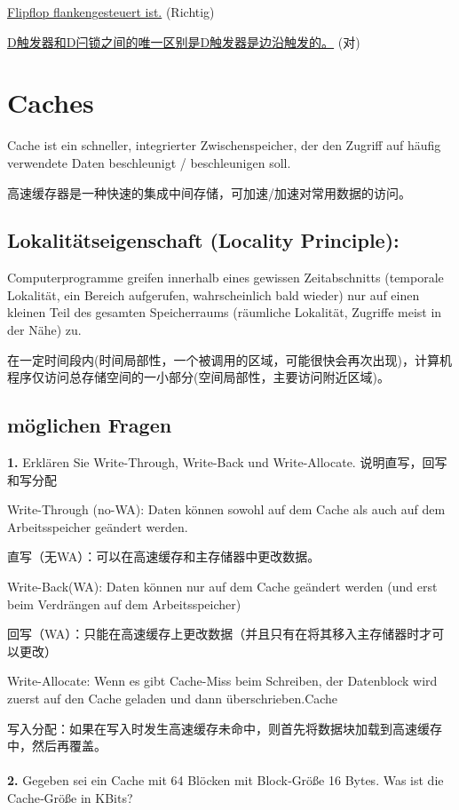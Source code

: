 \documentclass[fleqn]{article}
\begin{document}
\underline{Flipflop flankengesteuert ist.} (Richtig)

\underline{D触发器和D闩锁之间的唯一区别是D触发器是边沿触发的。} (对)

\section{Caches}

\noindent Cache ist ein schneller, integrierter Zwischenspeicher, der den Zugriff auf häufig verwendete Daten beschleunigt / beschleunigen soll.

\noindent 高速缓存器是一种快速的集成中间存储，可加速/加速对常用数据的访问。


\subsection{Lokalitätseigenschaft (Locality Principle):}

Computerprogramme greifen innerhalb eines gewissen Zeitabschnitts (temporale Lokalität, ein Bereich aufgerufen, wahrscheinlich bald wieder) nur auf einen kleinen Teil des gesamten Speicherraums (räumliche Lokalität, Zugriffe meist in der Nähe) zu.

在一定时间段内(时间局部性，一个被调用的区域，可能很快会再次出现)，计算机程序仅访问总存储空间的一小部分(空间局部性，主要访问附近区域)。


\subsection{möglichen Fragen}

\noindent\textbf{1.} Erklären Sie Write-Through, Write-Back und Write-Allocate. 说明直写，回写和写分配

Write-Through (no-WA): Daten können sowohl auf dem Cache als auch auf dem Arbeitsspeicher geändert werden.

直写（无WA）：可以在高速缓存和主存储器中更改数据。

Write-Back(WA): Daten können nur auf dem Cache geändert werden (und erst beim Verdrängen auf dem Arbeitsspeicher)

回写（WA）：只能在高速缓存上更改数据（并且只有在将其移入主存储器时才可以更改）

Write-Allocate: Wenn es gibt Cache-Miss beim Schreiben, der Datenblock wird zuerst auf den Cache geladen und dann überschrieben.Cache

写入分配：如果在写入时发生高速缓存未命中，则首先将数据块加载到高速缓存中，然后再覆盖。
\\
\\
\noindent\textbf{2.} Gegeben sei ein Cache mit 64 Blöcken mit Block‐Größe 16 Bytes. Was ist die Cache‐Größe in KBits?
\end{document}
